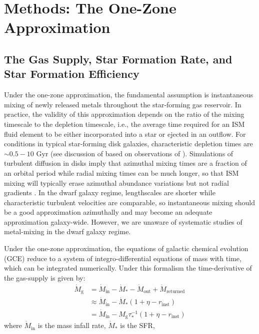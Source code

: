 
\section{Methods: The One-Zone Approximation}
\label{bursts:sec:methods}
\subsection{The Gas Supply, Star Formation Rate, and Star Formation Efficiency}
Under the one-zone approximation, the fundamental assumption is instantaneous 
mixing of newly released metals throughout the star-forming gas reservoir. 
In practice, the validity of this approximation depends on the ratio
of the mixing timescale to the depletion timescale, i.e., the average 
time required for an ISM fluid element to be either incorporated into
a star or ejected in an outflow.  For conditions in typical star-forming
disk galaxies, characteristic depletion times are $\sim 0.5-10\text{ Gyr}$
(see discussion of \citet{Weinberg2017b} based on observations
of \citealt{Leroy2008}).  Simulations of turbulent diffusion in disks
imply that azimuthal mixing times are a fraction of an orbital period
while radial mixing times can be much longer, so that ISM mixing will
typically erase azimuthal abundance variations but not radial
gradients \citep{Petit2015,Krumholz2018a}.
In the dwarf galaxy regime, lengthscales are shorter while characteristic
turbulent velocities are comparable, so instantaneous mixing should
be a good approximation azimuthally and may become an adequate 
approximation galaxy-wide.  However, we are unaware of systematic
studies of metal-mixing in the dwarf galaxy regime.
\par
Under the one-zone approximation,
the equations of galactic chemical evolution (GCE)
reduce to a system of integro-differential equations of mass with time, which 
can be integrated numerically. Under this formalism the time-derivative of the 
gas-supply is given by: 
\begin{subequations}\begin{align} 
\label{bursts:eq:mdot_gas} 
\dot{M}_\text{g} &= \dot{M}_\text{in} - \dot{M}_* - \dot{M}_\text{out} + 
\dot{M}_\text{returned} \\ 
&\approx \dot{M}_\text{in} - \dot{M}_*(1 + \eta - r_\text{inst}) \\ 
&= \dot{M}_\text{in} - M_\text{g}\tau_*^{-1}(1 + \eta - r_\text{inst}) 
\end{align}\end{subequations} 
where $\dot{M}_\text{in}$ is the mass infall rate, $\dot{M}_*$ is the SFR, 
